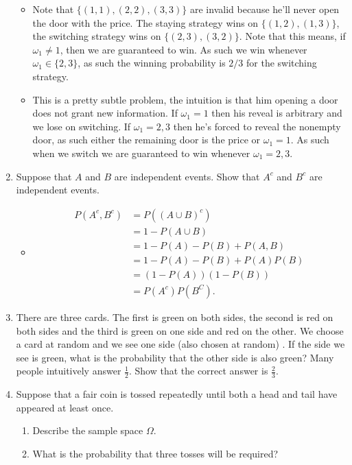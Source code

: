 \documentclass{article}
\begin{document}
\begin{enumerate}
		\begin{itemize}
			\item Note that $\{(1, 1), (2, 2), (3, 3)\}$ are invalid because he'll never open the door with the price. The staying strategy wins on $\{(1, 2), (1, 3)\}$, the switching strategy wins on $\{(2, 3), (3, 2)\}$. Note that this means, if $\omega_1 \neq 1$, then we are guaranteed to win. As such we win whenever $\omega_1 \in \{2, 3\}$, as such the winning probability is $2/3$ for the switching strategy.
			\item This is a pretty subtle problem, the intuition is that him opening a door does not grant new information. If $\omega_1 = 1$ then his reveal is arbitrary and we lose on switching. If $\omega_1 = 2, 3$ then he's forced to reveal the nonempty door, as such either the remaining door is the price or $\omega_1 = 1$. As such when we switch we are guaranteed to win whenever $\omega_1 = 2, 3$.
		\end{itemize}
	\item Suppose that $A$ and $B$ are independent events. Show that $A^c$ and $B^c$ are independent events.
		\begin{itemize}
			\item
			$$
			\begin{aligned}
			P(A^c, B^c) &= P((A \cup B)^c) \\
			&= 1 - P(A \cup B) \\
			&= 1 - P(A) - P(B) + P(A, B) \\
			&= 1 - P(A) - P(B) + P(A)P(B) \\
			&= (1 - P(A))(1 - P(B)) \\
			&= P(A^c)P(B^C).
			\end{aligned}
			$$
		\end{itemize}
	\item There are three cards. The first is green on both sides, the second is red on both sides and the third is green on one side and red on the other. We choose a card at random and we see one side (also chosen at random) . If the side we see is green, what is the probability that the other side is also green? Many people intuitively answer $\frac{1}{2}$. Show that the correct answer is $\frac{2}{3}$.
	\item Suppose that a fair coin is tossed repeatedly until both a head and tail have appeared at least once.
		\begin{enumerate}
			\item Describe the sample space $\Omega$.
			\item What is the probability that three tosses will be required?

\end{enumerate}
\end{enumerate}
\end{document}
